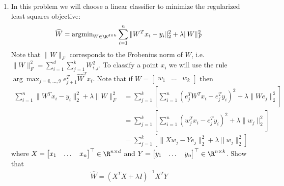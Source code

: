 \documentclass{article}
\begin{document}
\begin{aprob}
    \begin{enumerate}
        \item {} In this problem we will choose a linear classifier to minimize the regularized least squares objective:
        \begin{align*}
            \widehat{W} = \text{argmin}_{W \in \R^{d \times k}} \sum_{i=1}^{n} \| W^Tx_{i} - y_{i} \|^{2}_{2} + \lambda \|W\|_{F}^{2}
        \end{align*}
        Note that $\|W\|_{F}$ corresponds to the Frobenius norm of $W$, i.e. $\|W\|_{F}^{2} = \sum_{i=1}^d \sum_{j=1}^k W_{i,j}^2$. To classify a point $x_i$ we will use the rule $\arg\max_{j=0,\dots,9} e_{j+1}^T \widehat{W}^T x_i$. Note that if $W = \begin{bmatrix} w_1 & \dots & w_k \end{bmatrix}$ then
        \begin{align*}
            \sum_{i=1}^{n} \| W^Tx_{i} - y_{i} \|^{2}_{2} + \lambda \|W\|_{F}^{2} &= \sum_{j=1}^k \left[  \sum_{i=1}^n ( e_j^T W^T x_i - e_j^T y_i)^2 + \lambda \| W e_j \|_2^2 \right] \\
            &= \sum_{j=1}^k \left[  \sum_{i=1}^n ( w_j^T x_i - e_j^T y_i)^2 + \lambda \| w_j \|_2^2 \right] \\
            &= \sum_{j=1}^k \left[  \| X w_j - Y e_j\|_2^2 + \lambda \| w_j \|_2^2 \right]
        \end{align*}
        where $X = \begin{bmatrix} x_1 & \dots & x_n \end{bmatrix}^\top \in \R^{n \times d}$ and $Y = \begin{bmatrix} y_1 & \dots & y_n \end{bmatrix}^\top \in \R^{n \times k}$. Show that
        \begin{align*}
            \widehat{W} = (X^T X + \lambda I)^{-1} X^T Y
        \end{align*} 


\end{enumerate}
\end{aprob}
\end{document}

